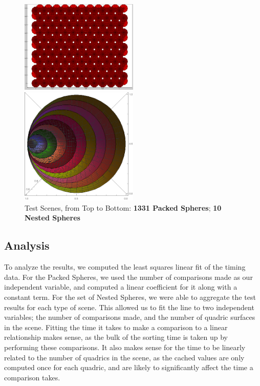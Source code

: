 \documentclass{cccg16}
\begin{document}
\begin{figure}
  \includegraphics[width=0.5\textwidth]{imgs/packedSpheres.png}
  
  \vspace{5mm}
  
  \includegraphics[width=0.5\textwidth]{imgs/hardEllipsoidsSingle.png}
  \caption{Test Scenes, from Top to Bottom:
    {\bf 1331 Packed Spheres};
    {\bf 10 Nested Spheres}}
  \label{fig:testScenes}
\end{figure}

\subsection{Analysis}
To analyze the results, we computed the least squares linear fit of
the timing data.  For the Packed Spheres, we used the number of
comparisons made as our independent variable, and computed a linear
coefficient for it along with a constant term.  For the set of Nested
Spheres, we were able to aggregate the test results for each type
of scene.  This allowed us to fit the line to two independent
variables; the number of comparisons made, and the number of quadric
surfaces in the scene.  Fitting the time it takes to make a comparison
to a linear relationship makes sense, as the bulk of the sorting time
is taken up by performing these comparisons.  It also makes sense for
the time to be linearly related to the number of quadrics in the
scene, as the cached values are only computed once for each quadric,
and are likely to significantly affect the time a comparison takes.
\end{document}
